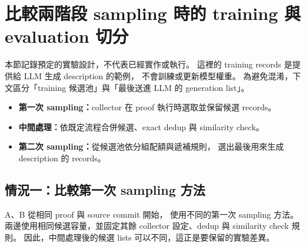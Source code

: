 % 

\section{比較兩階段 sampling 時的 training 與 evaluation 切分}
\label{sec:sampling-training-evaluation-workflows}

本節記錄預定的實驗設計，\allowbreak 不代表已經實作或執行。
這裡的 training records 是提供給 LLM 生成 description 的範例，\allowbreak
不會訓練或更新模型權重。
為避免混淆，\allowbreak 下文區分「training 候選池」與「最後送進 LLM 的 generation list」。

\begin{itemize}
  \item \textbf{第一次 sampling：}collector 在 proof 執行時選取並保留候選 records。
  \item \textbf{中間處理：}依既定流程合併候選、exact dedup 與 similarity check。
  \item \textbf{第二次 sampling：}從候選池依分組配額與遞補規則，\allowbreak
        選出最後用來生成 description 的 records。
\end{itemize}

\subsection{情況一：比較第一次 sampling 方法}
\label{subsec:holdout-first-sampling}

A、B 從相同 proof 與 source commit 開始，\allowbreak
使用不同的第一次 sampling 方法。
兩邊使用相同候選容量，\allowbreak 並固定其餘 collector 設定、dedup 與 similarity check 規則。
因此，中間處理後的候選 lists 可以不同，\allowbreak 這正是要保留的實驗差異。

